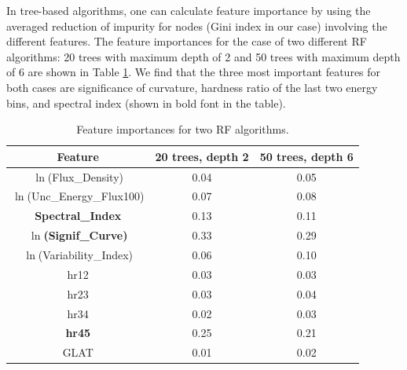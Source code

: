 In tree-based algorithms, one can calculate feature importance by using the averaged reduction of impurity for nodes (Gini index in our case) involving the different features. 
The feature importances for the case of two different RF algorithms: 20 trees with maximum depth of 2 and 50 trees with maximum depth of 6 are shown in Table \ref{tab:feat_imp}.
We find that the three most important features for both cases are significance of curvature, hardness ratio of the last two energy bins, and spectral index (shown in bold font in the table).


\begin{table}[!h]
    \tiny
    \centering
    \renewcommand{\tabcolsep}{1mm}
\renewcommand{\arraystretch}{1}

    \begin{tabular}{|c|c|c|}
    \hline
    Feature &  20 trees, depth 2& 50 trees, depth 6\\
    \hline
    $\ln$(Flux\_Density) & 0.04 & 0.05        \\
    \hline
    $\ln$(Unc\_Energy\_Flux100) & 0.07     & 0.08 \\
    \hline %
   {\bf Spectral\_Index} & 0.13     &   0.11\\
    \hline %
    {\bf $\ln$(Signif\_Curve)} & 0.33 &0.29  \\
    \hline
   $\ln$(Variability\_Index)&  0.06   &  0.10  \\
    \hline %
    hr12& 0.03 &0.03 \\
    \hline
     hr23& 0.03 &0.04 \\
    \hline
    hr34& 0.02 &0.03 \\
    \hline
   {\bf hr45} & 0.25 &0.21 \\
    \hline
    GLAT&0.01&0.02\\
    \hline
    \end{tabular}
    \vspace{0.4cm}
    \caption{Feature importances for two RF algorithms.}
    \label{tab:feat_imp}
\end{table}

